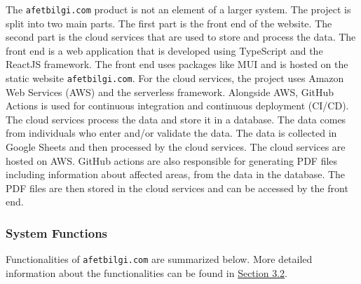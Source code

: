 \documentclass[a4paper]{article}
\begin{document}
                The \verb*|afetbilgi.com| product is not an element of a larger system. The project is split into two main parts.
                The first part is the front end of the website. The second part is the cloud services that are used to store and
                process the data. The front end is a web application that is developed using TypeScript and the ReactJS framework.
                The front end uses packages like MUI and is hosted on the static website \verb*|afetbilgi.com|. 
                For the cloud services, the project uses Amazon Web Services (AWS) and the serverless framework. Alongside AWS,
                GitHub Actions is used for continuous integration and continuous deployment (CI/CD). The cloud services process 
                the data and store it in a database. The data comes from individuals who enter and/or validate the data. The data
                is collected in Google Sheets and then processed by the cloud services. The cloud services are hosted on AWS.
                GitHub actions are also responsible for generating PDF files including information about affected areas, from the
                data in the database. The PDF files are then stored in the cloud services and can be accessed by the front end.

                \subsubsection{System Functions}
                
                Functionalities of \verb*|afetbilgi.com| are summarized below. More detailed information about the functionalities can be found in \hyperlink{subsection.3.2}{Section 3.2}.
\end{document}
